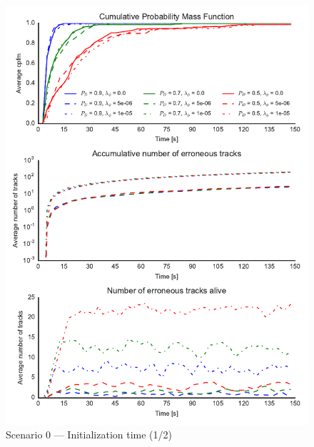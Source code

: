\begin{figure}
\centering
\includegraphics{Figures/plots/Scenario0_Init-Time(1-2).pdf}
\caption{Scenario 0 --- Initialization time (1/2)}\label{fig:init0_time_1-2}
\end{figure}


